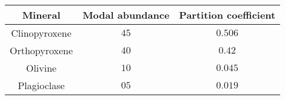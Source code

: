 \begin{tabular}{|c|c|c|}
     \hline
     \textbf{Mineral} & \textbf{Modal abundance \brak{\%}} & \textbf{Partition coefficient}\\
     \hline
     Clinopyroxene & $45$ & $0.506$ \\
      \hline
      Orthopyroxene & $40$ & $0.42$ \\
      \hline
      Olivine & $10$ & $0.045$ \\
      \hline
      Plagioclase & $05$ & $0.019$ \\
      \hline
\end{tabular}